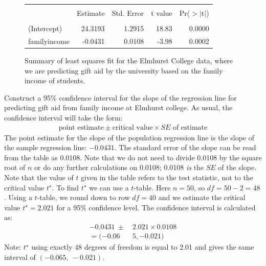 \begin{figure}[ht]
\centering
\begin{tabular}{l rrrr}
  \hline
  \vspace{-3.7mm} & & & & \\
 & Estimate & Std. Error & t value & Pr($>$$|$t$|$) \\ 
  \hline
  \vspace{-3.6mm} & & & & \\
(Intercept) & 24.3193 & 1.2915 & 18.83 & 0.0000 \\ 
family\us{}income & -0.0431 & 0.0108 & -3.98 & 0.0002 \\ 
  \hline
\end{tabular}
\caption{Summary of least squares fit for the Elmhurst College data, where we are predicting gift aid by the university based on the family income of students.}
\label{rOutputForIncomeAidLSRLine2}
\end{figure}


\begin{examplewrap}
\begin{nexample}
{Construct a 95\% confidence interval for the slope of the regression line for predicting gift aid from family income at Elmhurst college.  }
As usual, the confidence interval will take the form:  
\begin{align*}
\text{point estimate} \pm \text{critical value}\times SE \text{ of estimate}
\end{align*}
The point estimate for the slope of the population regression line is the slope of the sample regression line:  $-0.0431$.  The standard error of the slope can be read from the table as 0.0108.  Note that we do not need to divide 0.0108 by the square root of $n$ or do any further calculations on 0.0108; 0.0108 \emph{is} the $SE$ of the slope.  Note that the value of $t$ given in the table refers to the test statistic, not to the critical value $t^{\star}$.  To find $t^{\star}$ we can use a $t$-table. Here $n=50$, so $df=50-2=48$.  Using a $t$-table, we round down to row $df=40$ and we estimate the critical value $t^{\star}=2.021$ for a 95\% confidence level.  The confidence interval is calculated as:
\begin{align*}
-0.0431 \ \pm \ & 2.021\times 0.0108\\
=(-0.06&5, -0.021 )
\end{align*}
Note: $t^{\star}$ using exactly 48 degrees of freedom is equal to 2.01 and gives the same interval of $(-0.065,\ -0.021)$.
\end{nexample}
\end{examplewrap}


